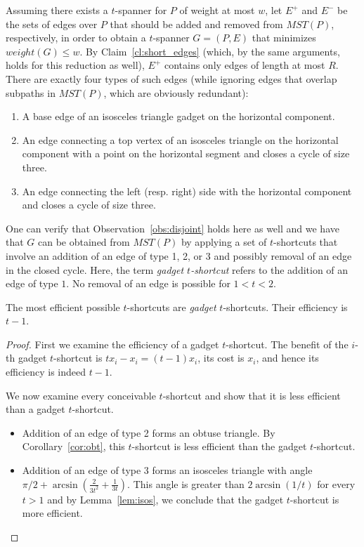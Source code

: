 \documentclass[a4paper]{llncs}
\begin{document}
Assuming there exists a $t$-spanner for $P$ of weight at most $w$,
let $E^+$ and $E^-$ be the sets of edges over $P$ that should be added and removed 
from $MST(P)$, respectively, in order to obtain a $t$-spanner $G=(P,E)$ 
that minimizes $weight(G) \leq w$.
By Claim~\ref{cl:short_edges} (which, by the same arguments, holds for this reduction as well), 
$E^+$ contains only edges of length at most $R$.
There are exactly four types of such edges 
(while ignoring edges that overlap subpaths in $MST(P)$, 
which are obviously redundant):

\begin{enumerate}
\item A base edge of an isosceles triangle gadget on the horizontal component.
\item An edge connecting a top vertex of an isosceles triangle on the horizontal component 
			with a point on the horizontal segment and closes a cycle of size three.
\item An edge connecting the left (resp. right) side with the horizontal component 
			and closes a cycle of size three.
\end{enumerate} 

One can verify that Observation~\ref{obs:disjoint} holds here as well and
we have that $G$ can be obtained from $MST(P)$ by applying 
a set of $t$-shortcuts that involve an addition of an edge of type 1, 2, or 3
and possibly removal of an edge in the closed cycle.
Here, the term \emph{gadget $t$-shortcut} refers to
the addition of an edge of type $1$. 
No removal of an edge is possible for $1<t<2$.



\begin{myclaim}\label{cl:tri2}
The most efficient possible $t$-shortcuts are \emph{gadget} $t$-shortcuts. 
Their efficiency is $t-1$.
\end{myclaim}

\begin{proof}
First we examine the efficiency of a gadget $t$-shortcut.
The benefit of the $i$-th gadget $t$-shortcut is $tx_i-x_i=(t-1)x_i$,
its cost is $x_i$, and hence its efficiency is indeed $t-1$.

We now examine every conceivable $t$-shortcut and show that it is 
less efficient than a gadget $t$-shortcut.

\begin{itemize}

\item Addition of an edge of type 2 forms an obtuse triangle. 
By Corollary~\ref{cor:obt}, this $t$-shortcut is less efficient than the gadget $t$-shortcut.

\item Addition of an edge of type 3 forms an isosceles triangle with angle \\
$\pi/2+\arcsin(\frac{2}{3t^2}+\frac{1}{3t})$. This angle is greater than $2\arcsin(1/t)$
for every $t>1$ and by Lemma~\ref{lem:isos}, we conclude that the gadget $t$-shortcut is more efficient.

\end{itemize}
\end{proof}
\end{document}
